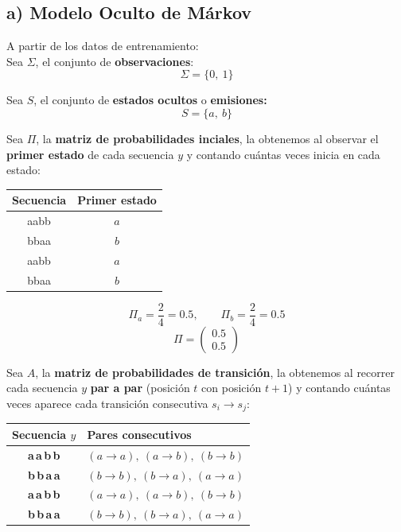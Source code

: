 \subsection*{a) Modelo Oculto de Márkov}
A partir de los datos de entrenamiento:\\

Sea $\Sigma$, el conjunto de \textbf{observaciones}:
\[
\Sigma = \{0,\ 1\}
\]

Sea $S$, el conjunto de \textbf{estados ocultos} o \textbf{emisiones:}
\[
S = \{a,\ b\}
\]

Sea $\Pi$, la \textbf{matriz de probabilidades inciales}, la obtenemos al observar el \textbf{primer estado} de cada secuencia $y$ y contando cuántas veces inicia en cada estado:
\begin{center}
  \begin{tabular}{|c|c|}
    \hline
    Secuencia & Primer estado \\
    \hline
    aabb & $a$ \\
    bbaa & $b$ \\
    aabb & $a$ \\
    bbaa & $b$ \\
    \hline
  \end{tabular}
\end{center}

\[
\Pi_a = \frac{2}{4} = 0.5, \qquad \Pi_b = \frac{2}{4} = 0.5
\]
\[
\Pi = \begin{pmatrix} 0.5 \\ 0.5 \end{pmatrix}
\]

\bigskip

Sea $A$, la \textbf{matriz de probabilidades de transición}, la obtenemos al recorrer cada secuencia $y$ \textbf{par a par} (posición $t$ con posición $t+1$) y contando cuántas veces aparece cada transición consecutiva $s_i \to s_j$:

\begin{center}
  \begin{tabular}{|c|l|}
    \hline
    Secuencia $y$ & Pares consecutivos \\
    \hline
    \textbf{a\,a\,b\,b} & $(a{\to}a),\ (a{\to}b),\ (b{\to}b)$ \\
    \textbf{b\,b\,a\,a} & $(b{\to}b),\ (b{\to}a),\ (a{\to}a)$ \\
    \textbf{a\,a\,b\,b} & $(a{\to}a),\ (a{\to}b),\ (b{\to}b)$ \\
    \textbf{b\,b\,a\,a} & $(b{\to}b),\ (b{\to}a),\ (a{\to}a)$ \\
    \hline
  \end{tabular}
\end{center}

